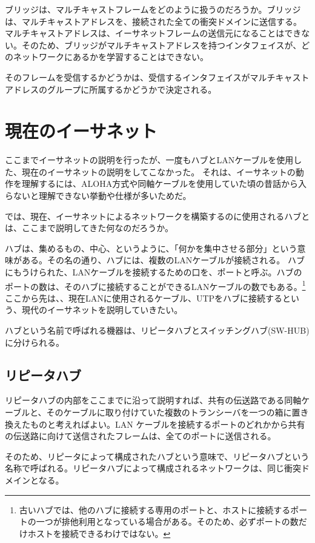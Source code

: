ブリッジは、マルチキャストフレームをどのように扱うのだろうか。ブリッジは、マルチキャストアドレスを、接続された全ての衝突ドメインに送信する。
マルチキャストアドレスは、イーサネットフレームの送信元になることはできない。そのため、ブリッジがマルチキャストアドレスを持つインタフェイスが、どのネットワークにあるかを学習することはできない。

そのフレームを受信するかどうかは、受信するインタフェイスがマルチキャストアドレスのグループに所属するかどうかで決定される。


\section{現在のイーサネット}

ここまでイーサネットの説明を行ったが、一度もハブとLANケーブルを使用した、現在のイーサネットの説明をしてこなかった。
それは、イーサネットの動作を理解するには、ALOHA方式や同軸ケーブルを使用していた頃の昔話から入らないと理解できない挙動や仕様が多いためだ。

では、現在、イーサネットによるネットワークを構築するのに使用されるハブとは、ここまで説明してきた何なのだろうか。

ハブは、集めるもの、中心、というように、「何かを集中させる部分」という意味がある。その名の通り、ハブには、複数のLANケーブルが接続される。
ハブにもうけられた、LANケーブルを接続するための口を、ポートと呼ぶ。ハブのポートの数は、そのハブに接続することができるLANケーブルの数でもある。\footnote{古いハブでは、他のハブに接続する専用のポートと、ホストに接続するポートの一つが排他利用となっている場合がある。そのため、必ずポートの数だけホストを接続できるわけではない。}ここから先は、、現在LANに使用されるケーブル、UTPをハブに接続するという、現代のイーサネットを説明していきたい。

ハブという名前で呼ばれる機器は、リピータハブとスイッチングハブ(SW-HUB)に分けられる。

\subsection{リピータハブ}

リピータハブの内部をここまでに沿って説明すれば、共有の伝送路である同軸ケーブルと、そのケーブルに取り付けていた複数のトランシーバを一つの箱に置き換えたものと考えればよい。LAN ケーブルを接続するポートのどれかから共有の伝送路に向けて送信されたフレームは、全てのポートに送信される。

そのため、リピータによって構成されたハブという意味で、リピータハブという名称で呼ばれる。リピータハブによって構成されるネットワークは、同じ衝突ドメインとなる。

